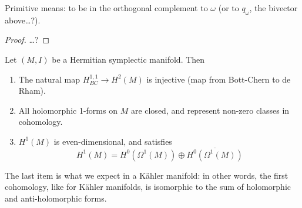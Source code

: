 \begin{remark}
	Primitive means: to be in the orthogonal complement to $\omega$ (or to $q_\omega$, the bivector above…?).
\end{remark}

\begin{proof}
	…?
\end{proof}

\begin{coro}
	Let $(M,I)$ be a Hermitian symplectic manifold. Then
	\begin{enumerate}[label=(\roman*)]
		\item The natural map $H^{1,1}_{BC}\to H^{2}(M)$ is injective (map from Bott-Chern to de Rham).
		\item All holomorphic 1-forms on $M$ are closed, and represent non-zero classes in cohomology.
		\item $H^{1}(M)$ is even-dimensional, and satisfies
			\[H^{1}(M)=H^{0}(\Omega^{1}(M))\oplus \overline{H^{0}(\Omega^{1}(M))}\]
	\end{enumerate}
\end{coro}

\begin{remark}
	The last item is what we expect in a K\"ahler manifold: in other words, the first cohomology, like for K\"ahler manifolds, is isomorphic to the sum of holomorphic and anti-holomorphic forms.
\end{remark}



